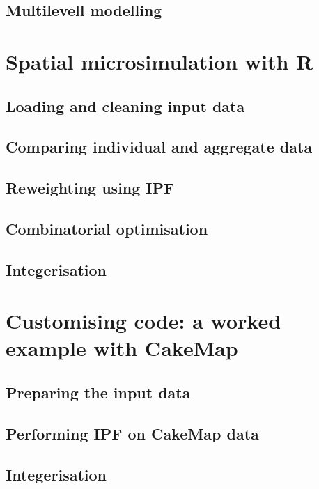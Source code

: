\documentclass[a5paper, 11pt, twoside]{book}  %
\begin{document}
\section{Multilevell modelling}

\chapter{Spatial microsimulation with R}


\section{Loading and cleaning input data}

\section{Comparing individual and aggregate data}

\section{Reweighting using IPF}

\section{Combinatorial optimisation}

\section{Integerisation}

\chapter{Customising code: a worked example with CakeMap}


\section{Preparing the input data}

\section{Performing IPF on CakeMap data}

\section{Integerisation}
\end{document}
